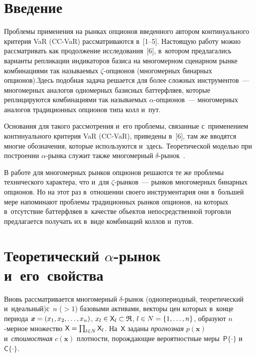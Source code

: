   
\vspace*{-2pt}



\thispagestyle{headings}

\begin{multicols}{2}

\label{st\stat}
   
  \section{Введение}
  
  Проблемы применения на рынках опционов введенного автором 
континуального критерия VaR (CC-VaR) рассматриваются в~[1--5]. Настоящую 
работу можно рассматривать как продолжение исследования~[6], в~котором 
предлагались варианты репликации индикаторов базиса на многомерном 
сценарном рынке комбинациями так называемых $\zeta$-оп\-ци\-онов 
(многомерных бинарных опционов).\linebreak Здесь подобная задача решается для более 
сложных инструментов~--- многомерных аналогов одномерных базисных 
баттерфляев, которые реплицируются комбинациями так называемых
  $\alpha$-оп\-ци\-онов~--- многомерных аналогов традиционных \mbox{опционов} типа 
колл и~пут. 
  
  Основания для такого рассмотрения и~его проб\-ле\-мы, связанные 
с~применением континуального критерия VaR (CC-VaR), приведены в~[6], там 
же вводятся многие обозначения, которые используются и~здесь. 
Теоретической моделью при построении $\alpha$-рын\-ка служит также 
многомерный $\delta$-ры\-нок~\cite{5-aga, 6-aga}. 
  
  В работе для многомерных рынков опционов решаются те же проблемы 
технического характера, что и~для $\zeta$-рын\-ков~--- рынков  многомерных 
бинарных опционов. Но на этот раз в~отношении своего инструментария они 
в~большей мере напоминают проб\-ле\-мы традиционных рынков опционов, на 
которых в~отсутствие баттерфляев в~качестве объектов непосредственной 
торговли предлагается получать их в~виде комбинаций коллов и~путов. 
  
  \section{Теоретический $\alpha$-рынок и~его~свойства}
  
  Вновь рассматривается многомерный $\delta$-ры\-нок (однопериодный, 
теоретический и~идеальный)\linebreak с~$n$ ($>1$) базовыми активами, векторы цен 
которых в~конце периода $\bm{x}\hm= (x_1, x_2, \ldots, x_n)$, $x_l\hm\in {\sf X}_l \hm\subset 
\mathfrak{R}$, $l\hm\in N\hm=\{1, \ldots , n\}$, образуют $n$-мер\-ное множество 
${\mathsf X}\hm=\prod_{l\in N} {\mathsf X}_l$. На~${\mathsf X}$ заданы 
\textit{прогнозная} $p(\bm{x})$ и~\textit{стоимостная} $c(\bm{x})$ плотности, 
по\-рож\-да\-ющие вероятностные меры~${\mathsf P}\{\cdot\}$ и~${\mathsf 
C}\{\cdot\}$. 
  

\end{multicols}
